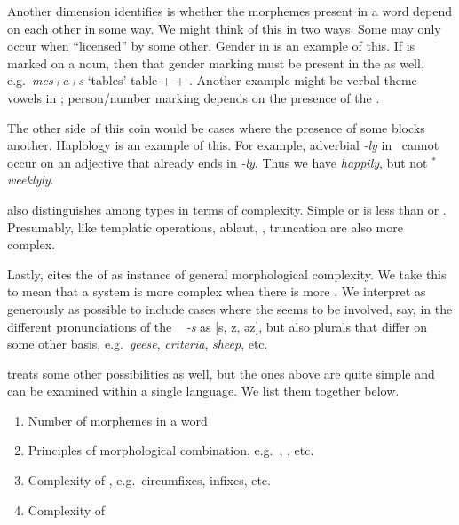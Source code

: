 \documentclass[output=paper,
modfonts
]{LSP/langsci}
\begin{document}
Another dimension \citeauthor{dimensions} identifies is whether the morphemes present in a word depend on each other in some way. We might think of this in two ways. Some  may only occur when ``licensed'' by some other. Gender in  is an example of this. If  is marked on a noun, then that gender marking must be present in the  as well, e.g.\ \emph{mes+a+s} `tables' table +  + . Another example might be verbal theme vowels in ; person/number marking depends on the presence of the .

The other side of this coin would be cases where the presence of some  blocks another. Haplology is an example of this. For example, adverbial \emph{-ly} in \e\ cannot occur on an adjective that already ends in \emph{-ly}. Thus we have \emph{happily}, but not ${}^*$\emph{weeklyly}.

\citeauthor{dimensions} also distinguishes among  types in terms of complexity. Simple  or  is less  than  or . Presumably,  like templatic operations, ablaut, , truncation are also more complex.

Lastly, \citeauthor{dimensions} cites the  of  as   instance of general morphological complexity. We take this to mean that a system is more complex when there is more . We interpret  as generously as possible to include cases where the  seems to be involved, say, in the different pronunciations of the \e\  \emph{-s} as [s, z, əz], but also plurals that differ on some other basis, e.g.\ \emph{geese}, \emph{criteria}, \emph{sheep}, etc.

\citeauthor{dimensions} treats some other possibilities as well, but the ones above are quite simple and can be examined within a single language. We list them together below.

\begin{enumerate}
\item Number of morphemes in a word %
\item Principles of morphological combination, e.g.\ , , etc. %
\item Complexity of , e.g.\ circumfixes, infixes, etc. %
\item Complexity of  %
\end{enumerate}
\end{document}
